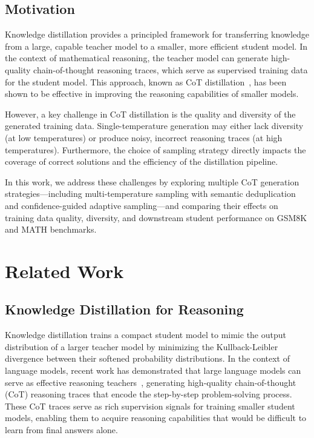 \documentclass{article}
\begin{document}
\subsection{Motivation}

Knowledge distillation provides a principled framework for transferring knowledge from a large, capable teacher model to a smaller, more efficient student model. In the context of mathematical reasoning, the teacher model can generate high-quality chain-of-thought reasoning traces, which serve as supervised training data for the student model. This approach, known as CoT distillation~\cite{ho2023large}, has been shown to be effective in improving the reasoning capabilities of smaller models.

However, a key challenge in CoT distillation is the quality and diversity of the generated training data. Single-temperature generation may either lack diversity (at low temperatures) or produce noisy, incorrect reasoning traces (at high temperatures). Furthermore, the choice of sampling strategy directly impacts the coverage of correct solutions and the efficiency of the distillation pipeline.

In this work, we address these challenges by exploring multiple CoT generation strategies—including multi-temperature sampling with semantic deduplication and confidence-guided adaptive sampling—and comparing their effects on training data quality, diversity, and downstream student performance on GSM8K and MATH benchmarks.

\section{Related Work}

\subsection{Knowledge Distillation for Reasoning}

Knowledge distillation trains a compact student model to mimic the output distribution of a larger teacher model by minimizing the Kullback-Leibler divergence between their softened probability distributions. In the context of language models, recent work has demonstrated that large language models can serve as effective reasoning teachers~\cite{ho2023large}, generating high-quality chain-of-thought (CoT) reasoning traces that encode the step-by-step problem-solving process. These CoT traces serve as rich supervision signals for training smaller student models, enabling them to acquire reasoning capabilities that would be difficult to learn from final answers alone.
\end{document}
